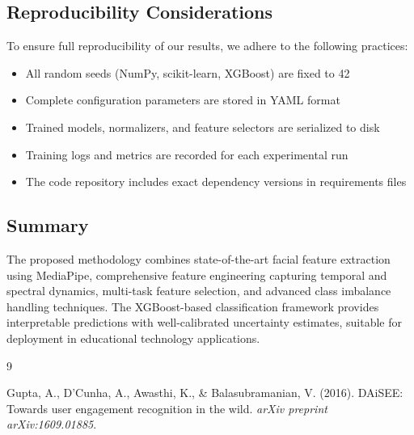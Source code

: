 \documentclass[11pt,a4paper]{article}
\begin{document}
\subsection{Reproducibility Considerations}

To ensure full reproducibility of our results, we adhere to the following practices:

\begin{itemize}
    \item All random seeds (NumPy, scikit-learn, XGBoost) are fixed to 42
    \item Complete configuration parameters are stored in YAML format
    \item Trained models, normalizers, and feature selectors are serialized to disk
    \item Training logs and metrics are recorded for each experimental run
    \item The code repository includes exact dependency versions in requirements files
\end{itemize}

\subsection{Summary}

The proposed methodology combines state-of-the-art facial feature extraction using MediaPipe, comprehensive feature engineering capturing temporal and spectral dynamics, multi-task feature selection, and advanced class imbalance handling techniques. The XGBoost-based classification framework provides interpretable predictions with well-calibrated uncertainty estimates, suitable for deployment in educational technology applications.

\begin{thebibliography}{9}

Gupta, A., D'Cunha, A., Awasthi, K., \& Balasubramanian, V. (2016).
DAiSEE: Towards user engagement recognition in the wild.
\textit{arXiv preprint arXiv:1609.01885}.

\end{thebibliography}
\end{document}
